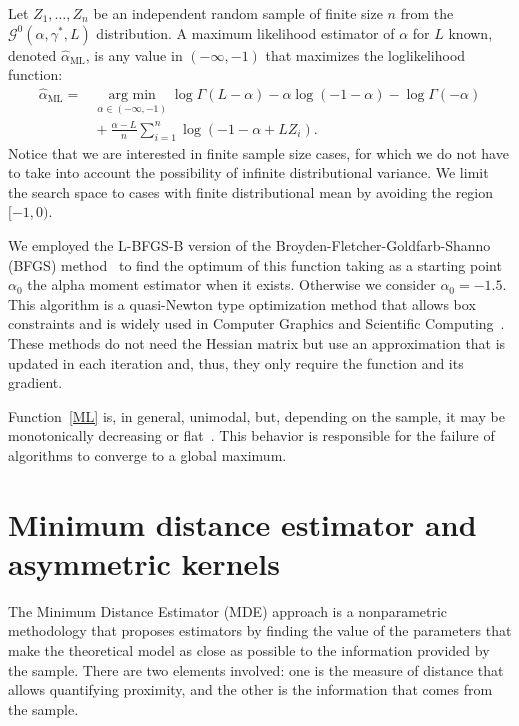 \documentclass[twocolumn]{svjour3}
\newcommand{\argmin}{\operatorname*{\text{arg min }}}
\begin{document}
Let $Z_1,\dots, Z_n$ be an independent random sample of finite size $n$ from the $\mathcal G^0(\alpha,\gamma^*,L)$ distribution.
A maximum likelihood estimator of $\alpha$ for $L$ known, denoted $\widehat\alpha_{\text{{ML}}}$, is any value in $(-\infty,-1)$ that maximizes the loglikelihood function:
\begin{align}
	\hat{\alpha}_{\text{{ML}}}=&\argmin_{\alpha \in (-\infty,-1)}\log \Gamma(L-\alpha)-
	\alpha\log(-1-\alpha)-\log\Gamma(-\alpha) \nonumber \\
	&\mbox{}+\frac{\alpha-L}{n} \sum_{i=1}^n\log(-1-\alpha+L Z_i).
	\label{ML}
\end{align}
Notice that we are interested in finite sample size cases, for which we do not have to take into account the possibility of infinite distributional variance.
We limit the search space to cases with finite distributional mean by avoiding the region $[-1,0)$.

We employed the L-BFGS-B version of the Broyden-Fletcher-Goldfarb-Shanno (BFGS) method~\cite{Luenberger2008} to find the optimum of this function taking as a starting point $\alpha_0$ the alpha moment estimator when it exists. Otherwise we consider $\alpha_0=-1.5$. This algorithm is a quasi-Newton type optimization method that allows box constraints and is widely used in Computer Graphics and Scientific Computing~\cite{FEI2014}. 
These methods do not need the Hessian matrix but use an approximation that is updated in each iteration and, thus, they only require the function and its gradient. 

Function~\eqref{ML} is, in general, unimodal, but, depending on the sample, it may be monotonically decreasing or flat~\cite{FreryCribariSouza:JASP:04}. 
This behavior is responsible for the failure of algorithms to converge to a global maximum.


\section{Minimum distance estimator and asymmetric kernels}
\label{distancekernel}

The Minimum Distance Estimator (MDE) approach is a nonparametric methodology that proposes estimators by finding the value of the parameters that make the theoretical model as close as possible to the information provided by the sample. 
There are two elements involved: one is the measure of distance that allows quantifying proximity, and the other is the information that comes from the sample.
\end{document}
